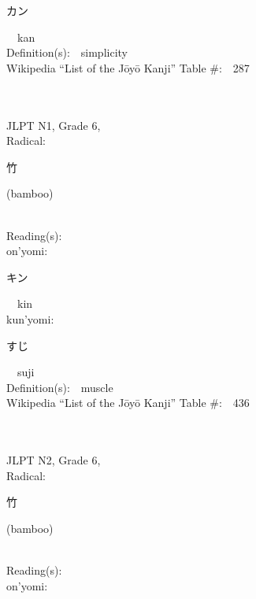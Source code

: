 \begin{multicols}{2}
{\hspace*{2em}}{\begin{CJK}{UTF8}{min} カン \end{CJK}}\ \ kan\ \ \\
Definition(s):\ \ simplicity \\
Wikipedia ``List of the J\=oy\=o Kanji'' Table \#:\ \ 287 \\
\ \ \\
{\fontsize{34pt}{40pt}  }\ \ \\  %
{JLPT N1, Grade 6, \\Radical:\ \ {\begin{CJK}{UTF8}{min} 竹 \end{CJK}} (bamboo) } \\
Reading(s):\ \ \\
{\hspace*{1em}}on'yomi:\ \ \\
{\hspace*{2em}}{\begin{CJK}{UTF8}{min} キン \end{CJK}}\ \ kin\ \ \\
{\hspace*{1em}}kun'yomi:\ \ \\
{\hspace*{2em}}{\begin{CJK}{UTF8}{min} すじ \end{CJK}}\ \ suji\ \ \\
Definition(s):\ \ muscle \\
Wikipedia ``List of the J\=oy\=o Kanji'' Table \#:\ \ 436 \\
\ \ \\
{\fontsize{34pt}{40pt}  }\ \ \\  %
{JLPT N2, Grade 6, \\Radical:\ \ {\begin{CJK}{UTF8}{min} 竹 \end{CJK}} (bamboo) } \\
Reading(s):\ \ \\
{\hspace*{1em}}on'yomi:\ \ \\

\end{multicols}
